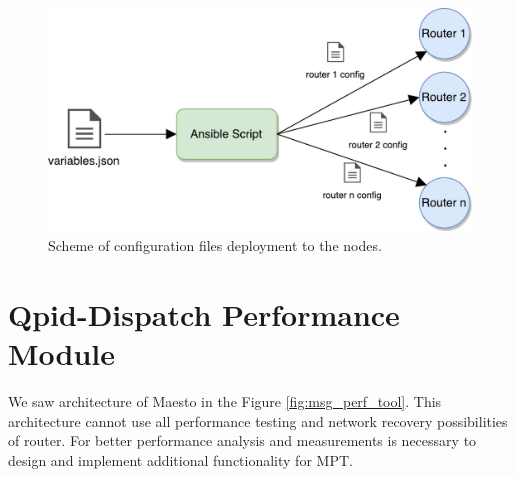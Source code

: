 \begin{figure}[H]
  \centering
  \includegraphics[width=12cm]{obrazky-figures/deployment.pdf}
  \caption{Scheme of configuration files deployment to the nodes.}
  \label{fig:deployment}
\end{figure}


\section{Qpid-Dispatch Performance Module}
We saw architecture of Maesto in the Figure \ref{fig:msg_perf_tool}. This architecture cannot use all performance testing and network recovery possibilities of router. For better performance analysis and measurements is necessary to design and implement additional functionality for MPT.

